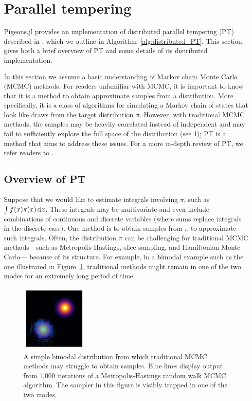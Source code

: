 \section{Parallel tempering}
\label{sec:PT}
Pigeons.jl provides an implementation of distributed parallel tempering (PT) described 
in \cite{syed2021nrpt}, which we outline in Algorithm~\ref{alg:distributed_PT}.
This section gives both a brief overview of PT and some details of 
its distributed implementation.

\medskip 
In this section we assume a basic understanding of 
Markov chain Monte Carlo (MCMC) methods.
For readers unfamiliar with MCMC, it is important to know that 
it is a method to obtain approximate samples from a distribution. 
More specifically, it is a class of algorithms for simulating a Markov chain of 
states that look like draws from the target distribution $\pi$.
However, with traditional 
MCMC methods, the samples may be heavily correlated instead of independent 
and may fail to sufficiently explore the 
full space of the distribution (see \cref{fig:bimodal}); 
PT is a method that aims to address these issues.
For a more in-depth review of PT, we refer readers to \cite{surjanovic2022vpt}.


\subsection{Overview of PT}
Suppose that we would like to estimate integrals involving $\pi$, such as 
$\int f(x) \pi(x) \, \mathrm{d} x$. 
These integrals may be multivariate and even include combinations of 
continuous and discrete variables (where sums replace integrals in the discrete 
case).
One method is to obtain samples from $\pi$ to approximate such integrals.
Often, the distribution 
$\pi$ can be challenging for traditional MCMC methods---such 
as Metropolis-Hastings, slice sampling, and Hamiltonian Monte Carlo---
because of its structure.
For example, in a bimodal example such as the one illustrated in 
Figure~\ref{fig:bimodal},
traditional methods might remain in one of the two modes for an extremely 
long period of time.

\begin{figure}[t]
    \centering
    \includegraphics[width=0.3\textwidth]{img/bimodal.pdf}
    \caption{A simple bimodal distribution from which traditional 
    MCMC methods may struggle to obtain samples. Blue lines display output 
    from 1,000 iterations of a Metropolis-Hastings random walk MCMC algorithm.
    The sampler in this figure is visibly trapped in one of the two modes.}
    \label{fig:bimodal}
\end{figure}

